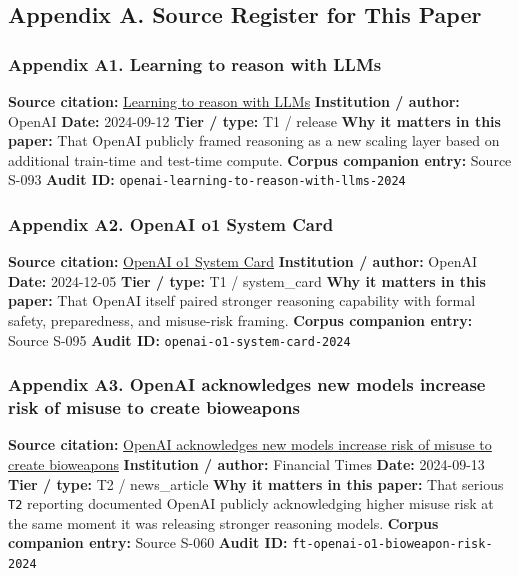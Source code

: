 \documentclass[
  american,
  11pt,
  letterpaper,
]{article}
\begin{document}
\subsection{Appendix A. Source Register for This
Paper}\label{appendix-a.-source-register-for-this-paper-6}

\subsubsection{Appendix A1. Learning to reason with
LLMs}\label{ch-06-appendix-a1-learning-to-reason-with-llms}

\textbf{Source citation:}
\href{https://openai.com/index/learning-to-reason-with-llms/}{Learning
to reason with LLMs} \textbf{Institution / author:} OpenAI
\textbf{Date:} 2024-09-12 \textbf{Tier / type:} T1 / release \textbf{Why
it matters in this paper:} That OpenAI publicly framed reasoning as a
new scaling layer based on additional train-time and test-time compute.
\textbf{Corpus companion entry:} Source S-093 \textbf{Audit ID:}
\texttt{openai-learning-to-reason-with-llms-2024}

\subsubsection{Appendix A2. OpenAI o1 System
Card}\label{ch-06-appendix-a2-openai-o1-system-card}

\textbf{Source citation:}
\href{https://openai.com/index/openai-o1-system-card/}{OpenAI o1 System
Card} \textbf{Institution / author:} OpenAI \textbf{Date:} 2024-12-05
\textbf{Tier / type:} T1 / system\_card \textbf{Why it matters in this
paper:} That OpenAI itself paired stronger reasoning capability with
formal safety, preparedness, and misuse-risk framing. \textbf{Corpus
companion entry:} Source S-095 \textbf{Audit ID:}
\texttt{openai-o1-system-card-2024}

\subsubsection{Appendix A3. OpenAI acknowledges new models increase risk
of misuse to create
bioweapons}\label{ch-06-appendix-a3-openai-acknowledges-new-models-increase-risk-of-misuse-to-create-bioweapons}

\textbf{Source citation:}
\href{https://www.ft.com/content/37ba7236-2a64-4807-b1e1-7e21ee7d0914}{OpenAI
acknowledges new models increase risk of misuse to create bioweapons}
\textbf{Institution / author:} Financial Times \textbf{Date:} 2024-09-13
\textbf{Tier / type:} T2 / news\_article \textbf{Why it matters in this
paper:} That serious \texttt{T2} reporting documented OpenAI publicly
acknowledging higher misuse risk at the same moment it was releasing
stronger reasoning models. \textbf{Corpus companion entry:} Source S-060
\textbf{Audit ID:} \texttt{ft-openai-o1-bioweapon-risk-2024}
\end{document}
